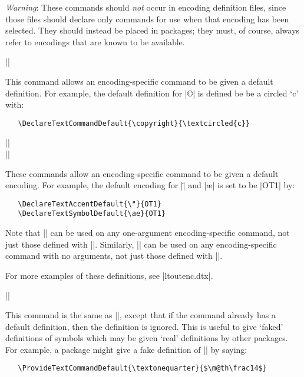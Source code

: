 \documentclass{ltxguide}[1995/11/28]
\begin{document}
\emph{Warning}: These commands should \emph{not} occur in encoding
definition files, since those files should declare only commands for use
when that encoding has been selected.  They should instead be placed
in packages; they must, of course, always refer to encodings that are
known to be available.
 
\begin{decl}[1994/12/01]
   |\DeclareTextCommandDefault|  
\end{decl}
This command allows an encoding-specific command to be given a default 
definition.  For example, the default definition for |\copyright| is 
defined be be a circled `c' with:
\begin{verbatim}
   \DeclareTextCommandDefault{\copyright}{\textcircled{c}}
\end{verbatim}
\begin{decl}[1994/12/01]
   |\DeclareTextAccentDefault|   \\
   |\DeclareTextSymbolDefault|  
\end{decl}
These commands allow an encoding-specific command to be given a
default encoding.  For example, the default encoding for |\"| and
|\ae| is set to be |OT1| by:
\begin{verbatim}
   \DeclareTextAccentDefault{\"}{OT1}
   \DeclareTextSymbolDefault{\ae}{OT1}
\end{verbatim}
Note that |\DeclareTextAccentDefault| can be used on any one-argument
encoding-specific command, not just those defined with
|\DeclareTextAccent|.  Similarly, |\DeclareTextSymbolDefault| can be
used on any encoding-specific command with no arguments, not just
those defined with |\DeclareTextSymbol|.
 
For more examples of these definitions, see |ltoutenc.dtx|.  
 
\begin{decl}[1994/12/01]
   |\ProvideTextCommandDefault|  
\end{decl}
This command is the same as |\DeclareTextCommandDefault|, except that
if the command already has a default definition, then the definition
is ignored.  This is useful to give `faked' definitions of symbols
which may be given `real' definitions by other packages.  For example,
a package might give a fake definition of |\textonequarter| by saying:
\begin{verbatim}
   \ProvideTextCommandDefault{\textonequarter}{$\m@th\frac14$}
\end{verbatim}
 
\end{document}
